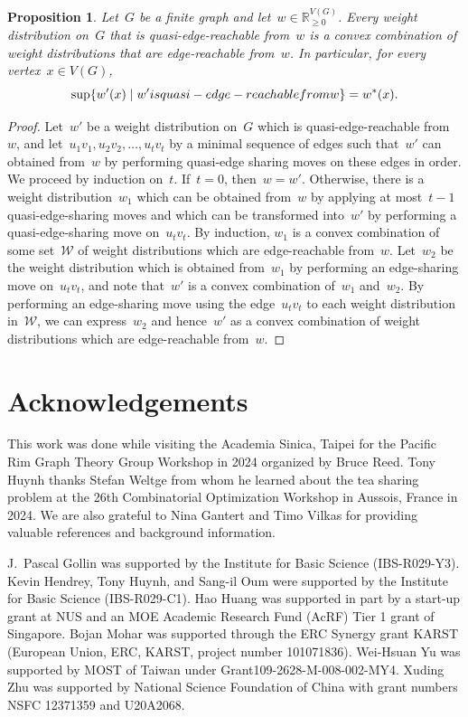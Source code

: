 \documentclass[reqno, 12pt]{amsart}
\numberwithin{equation}{section}
\numberwithin{figure}{section}
\theoremstyle{plain}
\newtheorem{prop}[thm]{Proposition}
\theoremstyle{definition}
\newcommand*{\weights}{\ensuremath{\mathbb{R}_{\geq 0}^{V(G)}}}
\begin{document}
\begin{prop}
    Let~$G$ be a finite graph and let~${w \in \weights}$. 
    Every weight distribution on~$G$ that is quasi-edge-reachable from~$w$ is a convex combination of weight distributions that are edge-reachable from~$w$. 
    In particular, for every vertex~${x \in V(G)}$, 
    \[
        \sup \{ w'(x) \mid w' \textnormal{ is quasi-edge-reachable from } w \} = w^*(x). 
    \]
\end{prop}
\begin{proof}
    Let~$w'$ be a weight distribution on~$G$ which is quasi-edge-reachable from~$w$, 
    and let~${u_1v_1, u_2v_2, \dots, u_tv_t}$ by a minimal sequence of edges such that~$w'$ can obtained from~$w$ by performing quasi-edge sharing moves on these edges in order. 
    We proceed by induction on~$t$. 
    If~${t = 0}$, then~${w = w'}$. 
    Otherwise, there is a weight distribution~$w_1$ which can be obtained from~$w$ by applying at most~${t-1}$ quasi-edge-sharing moves and which can be transformed into~$w'$ by performing a quasi-edge-sharing move on~${u_tv_t}$. 
    By induction, $w_1$ is a convex combination of some set~$\mathcal{W}$ of weight distributions which are edge-reachable from~$w$.
    Let~$w_2$ be the weight distribution which is obtained from~$w_1$ by performing an edge-sharing move on~${u_tv_t}$, 
    and note that~$w'$ is a convex combination of~$w_1$ and~$w_2$.
    By performing an edge-sharing move using the edge~$u_tv_t$ to each weight distribution in~$\mathcal{W}$, we can express~$w_2$ and hence~$w'$ as a convex combination of weight distributions which are edge-reachable from~$w$. 
\end{proof}

\medskip

\section*{Acknowledgements}

This work was done while visiting the Academia Sinica, Taipei for the Pacific Rim Graph Theory Group Workshop in 2024 organized by Bruce Reed. 
Tony Huynh thanks Stefan Weltge from whom he learned about the tea sharing problem at the 26th Combinatorial Optimization Workshop in Aussois, France in 2024. 
We are also grateful to Nina Gantert and Timo Vilkas for providing valuable references and background information. 

J.~Pascal Gollin was supported by the Institute for Basic Science (IBS-R029-Y3). 
Kevin Hendrey, Tony Huynh, and Sang-il Oum were supported by the Institute for Basic Science (IBS-R029-C1). 
Hao Huang was supported in part by a start-up grant
at NUS and an MOE Academic Research Fund (AcRF) Tier 1 grant of Singapore. 
Bojan Mohar was supported through the ERC Synergy grant KARST (European Union, ERC, KARST, project number 101071836).
Wei-Hsuan Yu was supported by MOST of Taiwan under Grant109-2628-M-008-002-MY4. 
Xuding Zhu was supported by National Science Foundation of China with
grant numbers NSFC 12371359 and U20A2068. 
\end{document}

